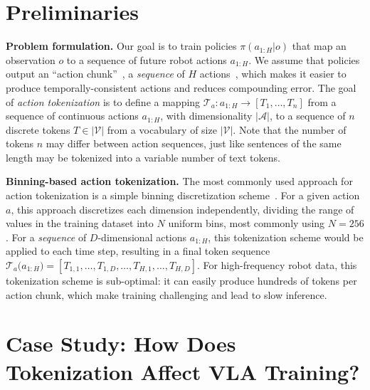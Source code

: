 \section{Preliminaries}
\label{sec:prelim}

\noindent\textbf{Problem formulation.}
Our goal is to train policies $\pi(a_{1:H} \vert o)$ that map an observation $o$ to a sequence of future robot actions $a_{1:H}$. We assume that policies output an ``action chunk''~\cite{zhao2023learning,laiaction}, a \emph{sequence} of $H$ actions~\citep{chi2023diffusionpolicy,black2024pi_0,zhao2023learning}, which makes it easier to produce temporally-consistent actions and reduces compounding error. The goal of \textit{action tokenization} is to define a mapping $\mathcal{T}_a: a_{1:H} \rightarrow [T_1, \dots, T_n]$
from a sequence of continuous actions $a_{1:H}$, with dimensionality $\vert \mathcal{A}\vert$, to a sequence of $n$ discrete tokens $T \in \vert \mathcal{V}\vert$ from a vocabulary of size $\vert \mathcal{V}\vert$. Note that the number of tokens $n$ may differ between action sequences, just like sentences of the same length may be tokenized into a variable number of text tokens. 

\noindent\textbf{Binning-based action tokenization.}
The most commonly used approach for action tokenization is a simple binning discretization scheme~\citep{rt12022arxiv,rt22023arxiv,kim2024openvla,zhen20243dvla,reed2022generalist}. For a given action $a$, this approach discretizes each dimension independently, dividing the range of values in the training dataset into $N$ uniform bins, most commonly using $N=256$. For a \emph{sequence} of $D$-dimensional actions $a_{1:H}$, this tokenization scheme would be applied to each time step, resulting in a final token sequence $\mathcal{T}_a\big(a_{1:H}\big) = [T_{1, 1}, \dots, T_{1, D}, \dots, T_{H, 1}, \dots, T_{H, D}]$. For high-frequency robot data, this tokenization scheme is sub-optimal: it can easily produce hundreds of tokens per action chunk, which make training challenging and lead to slow inference.

\section{Case Study: How Does Tokenization Affect VLA Training?}
\label{sec:educational_example}

